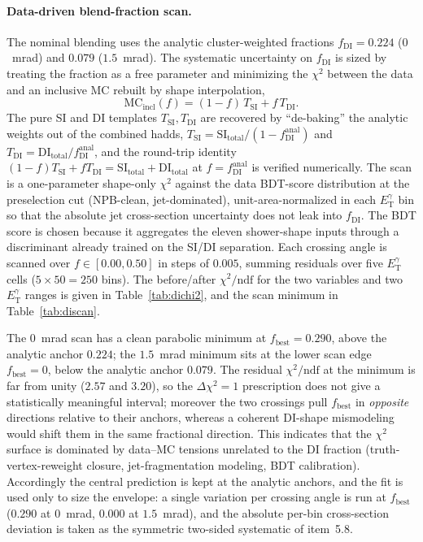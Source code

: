 \documentclass[11pt]{article}
\newcommand{\ETg}{E_{\mathrm{T}}^{\gamma}}
\begin{document}
\paragraph{Data-driven blend-fraction scan.} The nominal blending uses the
analytic cluster-weighted fractions $f_{\mathrm{DI}}=0.224$ ($0$~mrad) and
$0.079$ ($1.5$~mrad). The systematic uncertainty on $f_{\mathrm{DI}}$ is sized by
treating the fraction as a free parameter and minimizing the $\chi^2$ between the
data and an inclusive MC rebuilt by shape interpolation,
\begin{equation}
  \mathrm{MC}_{\mathrm{incl}}(f) = (1-f)\,T_{\mathrm{SI}} + f\,T_{\mathrm{DI}}.
\end{equation}
The pure SI and DI templates $T_{\mathrm{SI}},T_{\mathrm{DI}}$ are recovered by
``de-baking'' the analytic weights out of the combined hadds,
$T_{\mathrm{SI}}=\mathrm{SI}_{\mathrm{total}}/(1-f_{\mathrm{DI}}^{\mathrm{anal}})$
and
$T_{\mathrm{DI}}=\mathrm{DI}_{\mathrm{total}}/f_{\mathrm{DI}}^{\mathrm{anal}}$,
and the round-trip identity
$(1-f)T_{\mathrm{SI}}+fT_{\mathrm{DI}}=\mathrm{SI}_{\mathrm{total}}+\mathrm{DI}_{\mathrm{total}}$
at $f=f_{\mathrm{DI}}^{\mathrm{anal}}$ is verified numerically. The scan is a
one-parameter shape-only $\chi^2$ against the data BDT-score distribution at the
preselection cut (NPB-clean, jet-dominated), unit-area-normalized in each $\ETg$
bin so that the absolute jet cross-section uncertainty does not leak into
$f_{\mathrm{DI}}$. The BDT score is chosen because it aggregates the eleven
shower-shape inputs through a discriminant already trained on the SI/DI
separation. Each crossing angle is scanned over $f\in[0.00,0.50]$ in steps of
$0.005$, summing residuals over five $\ETg$ cells ($5\times50=250$ bins). The
before/after $\chi^2/\mathrm{ndf}$ for the two variables and two $\ETg$ ranges is
given in Table~\ref{tab:dichi2}, and the scan minimum in Table~\ref{tab:discan}.

The $0$~mrad scan has a clean parabolic minimum at $f_{\mathrm{best}}=0.290$, above
the analytic anchor $0.224$; the $1.5$~mrad minimum sits at the lower scan edge
$f_{\mathrm{best}}=0$, below the analytic anchor $0.079$. The residual
$\chi^2/\mathrm{ndf}$ at the minimum is far from unity ($2.57$ and $3.20$), so the
$\Delta\chi^2=1$ prescription does not give a statistically meaningful interval;
moreover the two crossings pull $f_{\mathrm{best}}$ in \emph{opposite} directions
relative to their anchors, whereas a coherent DI-shape mismodeling would shift them
in the same fractional direction. This indicates that the $\chi^2$ surface is
dominated by data--MC tensions unrelated to the DI fraction (truth-vertex-reweight
closure, jet-fragmentation modeling, BDT calibration). Accordingly the central
prediction is kept at the analytic anchors, and the fit is used only to size the
envelope: a single variation per crossing angle is run at $f_{\mathrm{best}}$
($0.290$ at $0$~mrad, $0.000$ at $1.5$~mrad), and the absolute per-bin cross-section
deviation is taken as the symmetric two-sided systematic of item~5.8.
\end{document}
